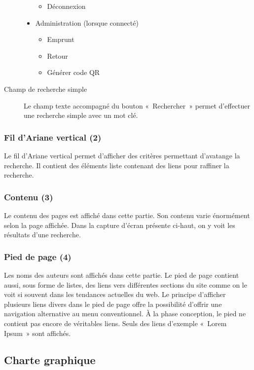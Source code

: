 \documentclass[letter, 11pt]{report}
\begin{document}
\begin{description}
\begin{itemize}
\begin{itemize}
				\item Déconnexion
			\end{itemize}
		\end{itemize}
			\begin{itemize}
			\item Administration (lorsque connecté)
			\begin{itemize}
				\item Emprunt
				\item Retour
				\item Générer code QR
			\end{itemize}
		\end{itemize}
	\item[Champ de recherche simple] Le champ texte accompagné du bouton «~Rechercher~» permet d'effectuer une recherche simple avec un mot clé.
\end{description}

\subsubsection{Fil d'Ariane vertical (2)}
Le fil d'Ariane vertical permet d'afficher des critères permettant d'avatange la recherche. Il contient des éléments liste contenant des liens pour raffiner la recherche.

\subsubsection{Contenu (3)}
Le contenu des pages est affiché dans cette partie. Son contenu varie énormément selon la page affichée. Dans la capture d'écran présente ci-haut, on y voit les résultats d'une recherche.

\subsubsection{Pied de page (4)}
Les noms des auteurs sont affichés dans cette partie. Le pied de page contient aussi, sous forme de listes, des liens vers différentes sections du site comme on le voit si souvent dans les tendances actuelles du web. Le principe d'afficher plusieurs liens divers dans le pied de page offre la possibilité d'offrir une navigation alternative au menu conventionnel. À la phase conception, le pied ne contient pas encore de véritables liens. Seuls des liens d'exemple «~Lorem Ipsum~» sont affichés.

\subsection{Charte graphique}
\end{document}
